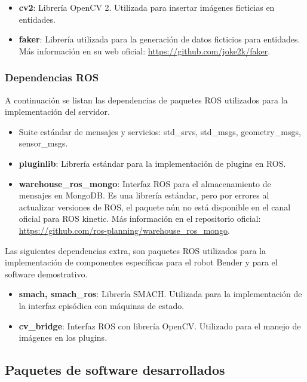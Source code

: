 \begin{itemize}
\item {\bfseries cv2}: Librería OpenCV 2. Utilizada para insertar imágenes ficticias en entidades. 
\item {\bfseries faker}: Librería utilizada para la generación de datos ficticios para entidades. Más información en su web oficial: \url{https://github.com/joke2k/faker}.
\end{itemize}


\subsubsection{Dependencias ROS}

A continuación se listan las dependencias de paquetes ROS utilizados para la implementación del servidor.
\begin{itemize}
	\item Suite estándar de mensajes y servicios: std\_srvs, std\_msgs, geometry\_msgs, sensor\_msgs.
	\item {\bfseries pluginlib}: Librería estándar para la implementación de plugins en ROS.
	\item {\bfseries warehouse\_ros\_mongo}: Interfaz ROS para el almacenamiento de mensajes en MongoDB. Es una librería estándar, pero por errores al actualizar versiones de ROS, el paquete aún no está disponible en el canal oficial para ROS kinetic. Más información en el repositorio oficial: \url{https://github.com/ros-planning/warehouse\_ros\_mongo}.
\end{itemize}

Las siguientes dependencias extra, son paquetes ROS utilizados para la implementación de componentes específicas para el robot Bender y para el software demostrativo.
\begin{itemize}
\item {\bfseries smach, smach\_ros}: Librería SMACH. Utilizada para la implementación de la interfaz episódica con máquinas de estado.
\item {\bfseries cv\_bridge}: Interfaz ROS con librería OpenCV. Utilizado para el manejo de imágenes en los plugins.
\end{itemize}


\subsection{Paquetes de software desarrollados}\label{sec:impl_packages}

